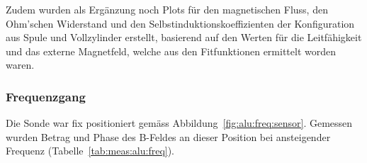 Zudem  wurden als  Erg\"anzung noch  Plots f\"ur  den magnetischen  Fluss, den
Ohm'schen Widerstand  und den Selbstinduktionskoeffizienten  der Konfiguration
aus  Spule und  Vollzylinder  erstellt,  basierend auf  den  Werten f\"ur  die
Leitf\"ahigkeit  und  das externe  Magnetfeld,  welche  aus den  Fitfunktionen
ermittelt worden waren.


{%
    \clearpage
    \pdfpagewidth
	\textwidth
    \addtolength{\textwidth}{70mm}


    \subsubsection{Frequenzgang}
    \label{sec:ausw:subsec:hohlz:subsubsec:steel}

	\begin{minipage}[t]{0.33\textwidth}
        \vspace{0pt}
        Die       Sonde       war        fix       positioniert       gem\"ass
        Abbildung~\ref{fig:alu:freq:sensor}. Gemessen   wurden    Betrag   und
        Phase  des  B-Feldes  an  dieser Position  bei  ansteigender  Frequenz
        (Tabelle~\ref{tab:meas:alu:freq}).



\end{minipage}}
